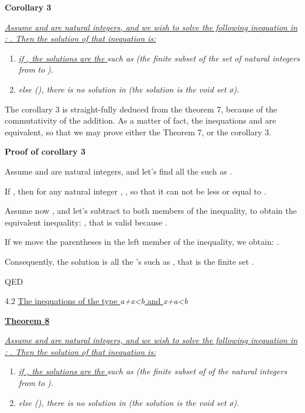 \documentclass{article}
\providecommand{\tightlist}{%
  \setlength{\itemsep}{0pt}\setlength{\parskip}{0pt}}
\begin{document}
\textbf{Corollary 3}

\ul{\emph{Assume }}\ul{\emph{ and }}\ul{\emph{ are natural integers, and we wish to solve the following inequation in }}\ul{\emph{: }}\ul{\emph{. Then the solution of that inequation is:}}

\begin{enumerate}
\tightlist
\item \ul{\emph{if }}\ul{\emph{, the solutions are the }}\emph{ such as }\emph{ (the finite subset of the set }\emph{ of natural integers from }\emph{ to }\emph{).}
\item \emph{else (}\emph{), there is no solution in }\emph{ (the solution is the void set }\emph{ø}\emph{).}
\end{enumerate}

The corollary 3 is straight-fully deduced from the theorem 7, because of the commutativity of the addition. As a matter of fact, the inequations  and  are equivalent, so that we may prove either the Theorem 7, or the corollary 3.

\textbf{Proof of corollary 3}

Assume  and  are natural integers, and let’s find all the  such as .

If , then for any natural integer , , so that it can not be less or equal to .

Assume now , and let’s subtract  to both members of the inequality, to obtain the equivalent inequality: , that is valid because .

If we move the parentheses in the left member of the inequality, we obtain: .

Consequently, the solution is all the ’s such as , that is the finite set .

QED

4.2 \ul{The inequations of the type }\emph{a+x<b}\ul{ and }\emph{x+a<b}

\ul{\textbf{Theorem 8}}

\ul{\emph{Assume }}\ul{\emph{ and }}\ul{\emph{ are natural integers, and we wish to solve the following inequation in }}\ul{\emph{: }}\ul{\emph{. Then the solution of that inequation is:}}

\begin{enumerate}
\tightlist
\item \ul{\emph{if }}\ul{\emph{, the solutions are the }}\emph{ such as }\emph{ (the finite subset of }\emph{ of the natural integers from }\emph{ to }\emph{).}
\item \emph{else (}\emph{), there is no solution in }\emph{ (the solution is the void set }\emph{ø}\emph{).}
\end{enumerate}
\end{document}

